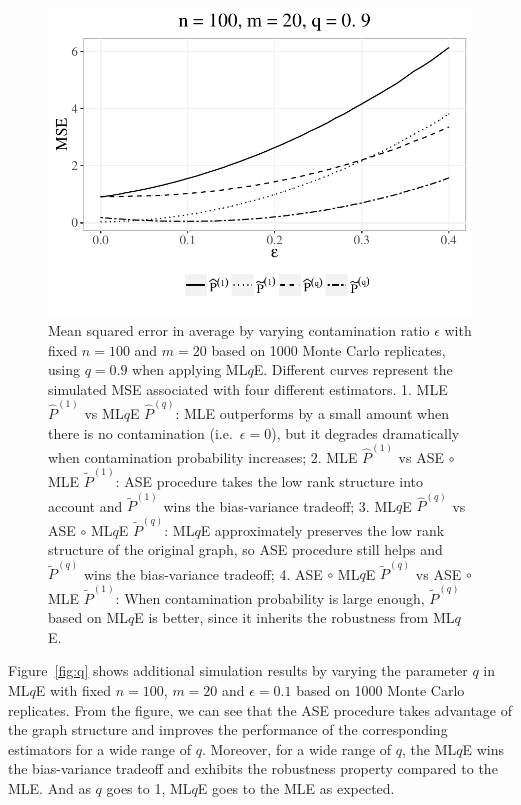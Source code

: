 \documentclass[a4paper]{article}
\renewcommand{\hat}{\widehat}
\begin{document}
\begin{figure}[!htb]
\centering
\includegraphics[width=1\textwidth]{sim_eps.pdf}
\caption{Mean squared error in average by varying contamination ratio $\epsilon$ with fixed $n = 100$ and $m = 20$ based on 1000 Monte Carlo replicates, using $q=0.9$ when applying ML$q$E.
Different curves represent the simulated MSE associated with four different estimators.
1. MLE $\hat{P}^{(1)}$ vs ML$q$E $\hat{P}^{(q)}$:
MLE outperforms by a small amount when there is no contamination (i.e.\ $\epsilon = 0$), but it degrades dramatically when contamination probability increases;
2. MLE $\hat{P}^{(1)}$ vs ASE $\circ$ MLE $\widetilde{P}^{(1)}$: 
ASE procedure takes the low rank structure into account and $\widetilde{P}^{(1)}$ wins the bias-variance tradeoff;
3. ML$q$E $\hat{P}^{(q)}$ vs ASE $\circ$ ML$q$E $\widetilde{P}^{(q)}$: 
ML$q$E approximately preserves the low rank structure of the original graph, so ASE procedure still helps and $\widetilde{P}^{(q)}$ wins the bias-variance tradeoff;
4. ASE $\circ$ ML$q$E $\widetilde{P}^{(q)}$ vs ASE $\circ$ MLE $\widetilde{P}^{(1)}$: 
When contamination probability is large enough, $\widetilde{P}^{(q)}$ based on ML$q$E is better, since it inherits the robustness from ML$q$E.}
\label{fig:eps}
\end{figure}

Figure~\ref{fig:q} shows additional simulation results by varying the parameter $q$ in ML$q$E with fixed $n = 100$, $m = 20$ and $\epsilon = 0.1$ based on 1000 Monte Carlo replicates. 
From the figure, we can see that the ASE procedure takes advantage of the graph structure and improves the performance of the corresponding estimators for a wide range of $q$. Moreover, for a wide range of $q$, the ML$q$E wins the bias-variance tradeoff and exhibits the robustness property compared to the MLE. And as $q$ goes to 1, ML$q$E goes to the MLE as expected.
\end{document}
